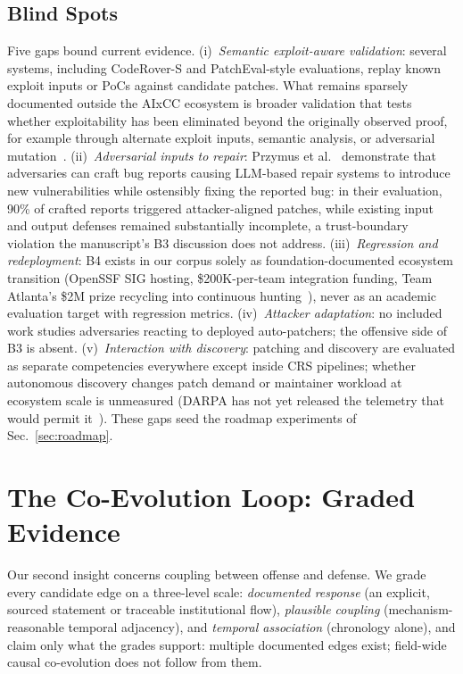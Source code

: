 \documentclass[conference,compsoc]{IEEEtran}
\begin{document}
\subsection{Blind Spots}
Five gaps bound current evidence. (i)~\emph{Semantic exploit-aware validation}: several
systems, including CodeRover-S and PatchEval-style evaluations, replay known exploit inputs
or PoCs against candidate patches. What remains sparsely documented outside the AIxCC
ecosystem is broader validation that tests whether exploitability has been eliminated beyond
the originally observed proof, for example through alternate exploit inputs, semantic analysis,
or adversarial mutation~\cite{ossfuzz-aifixing-2024,patcheval2025}.
(ii)~\emph{Adversarial inputs to repair}: Przymus et al.~\cite{advbugreports2026} demonstrate
that adversaries can craft bug reports causing LLM-based repair systems to introduce new
vulnerabilities while ostensibly fixing the reported bug: in their evaluation, 90\% of crafted
reports triggered attacker-aligned patches, while existing input and output defenses remained
substantially incomplete, a trust-boundary violation the manuscript's B3 discussion does not address.
(iii)~\emph{Regression and redeployment}: B4 exists in our corpus solely as foundation-documented
ecosystem transition (OpenSSF SIG hosting, \$200K-per-team integration funding, Team Atlanta's
\$2M prize recycling into continuous hunting~\cite{openssfaixcc2026,tobbuttercup2025,taafc2025}), 
never as an academic evaluation target with regression metrics. (iv)~\emph{Attacker
adaptation}: no included work studies adversaries reacting to deployed auto-patchers; the
offensive side of B3 is absent. (v)~\emph{Interaction with discovery}: patching and discovery
are evaluated as separate competencies everywhere except inside CRS pipelines; whether autonomous
discovery changes patch demand or maintainer workload at ecosystem scale is unmeasured (DARPA has
not yet released the telemetry that would permit it~\cite{tobbuttercup2025}). These gaps seed
the roadmap experiments of Sec.~\ref{sec:roadmap}.

\vspace{6pt}
\section{The Co-Evolution Loop: Graded Evidence}
\label{sec:coevolution}
Our second insight concerns coupling between offense and defense. We grade every candidate edge
on a three-level scale: \emph{documented response} (an explicit, sourced statement or
traceable institutional flow), \emph{plausible coupling} (mechanism-reasonable temporal
adjacency), and \emph{temporal association} (chronology alone), and claim only what the
grades support: multiple documented edges exist; field-wide causal co-evolution does not follow
from them.
\end{document}

